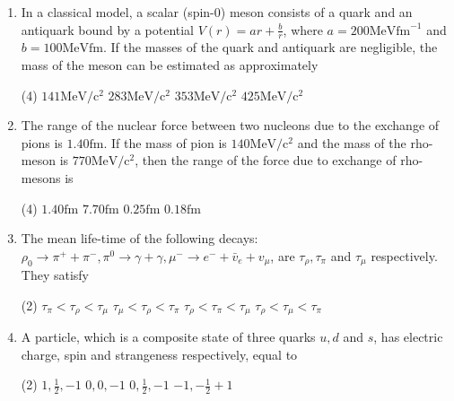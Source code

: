 \begin{enumerate}
	\item  In a classical model, a scalar (spin-0) meson consists of a quark and an antiquark bound by a potential $V(r)=a r+\frac{b}{r}$, where $a=200 \mathrm{MeV} \mathrm{fm}^{-1}$ and $b=100 \mathrm{MeV} \mathrm{fm}$. If the masses of the quark and antiquark are negligible, the mass of the meson can be estimated as approximately
	{}
	 \begin{tasks}(4)
		\task[\textbf{a.}]$141 \mathrm{MeV} / \mathrm{c}^2$
		\task[\textbf{b.}] $283 \mathrm{MeV} / \mathrm{c}^2$
		\task[\textbf{c.}]$353 \mathrm{MeV} / \mathrm{c}^2$
		\task[\textbf{d.}] $425 \mathrm{MeV} / \mathrm{c}^2$
	\end{tasks}

	\item  The range of the nuclear force between two nucleons due to the exchange of pions is $1.40 \mathrm{fm}$. If the mass of pion is $140 \mathrm{MeV} / \mathrm{c}^2$ and the mass of the rho-meson is $770 \mathrm{MeV} / \mathrm{c}^2$, then the range of the force due to exchange of rho-mesons is
	{}
	 \begin{tasks}(4)
		\task[\textbf{a.}]$1.40 \mathrm{fm}$
		\task[\textbf{b.}]$7.70 \mathrm{fm}$
		\task[\textbf{c.}]$0.25 \mathrm{fm}$
		\task[\textbf{d.}]$0.18 \mathrm{fm}$ 
	\end{tasks}

	\item  The mean life-time of the following decays: $\rho_0 \rightarrow \pi^{+}+\pi^{-}, \pi^0 \rightarrow \gamma+\gamma, \mu^{-} \rightarrow e^{-}+\bar{v}_e+v_\mu$, are $\tau_\rho, \tau_\pi$ and $\tau_\mu$ respectively.
	They satisfy
	{}
	 \begin{tasks}(2)
		\task[\textbf{a.}]$\tau_\pi<\tau_\rho<\tau_\mu$
		\task[\textbf{b.}]$\tau_\mu<\tau_\rho<\tau_\pi$
		\task[\textbf{c.}]$\tau_\rho<\tau_\pi<\tau_\mu$
		\task[\textbf{d.}] $\tau_\rho<\tau_\mu<\tau_\pi$
	\end{tasks}

	\item  A particle, which is a composite state of three quarks $u, d$ and $s$, has electric charge, spin and strangeness respectively, equal to
	{}
	 \begin{tasks}(2)
		\task[\textbf{a.}]$1, \frac{1}{2},-1$
		\task[\textbf{b.}]$0,0,-1$
		\task[\textbf{c.}]$0, \frac{1}{2},-1$
		\task[\textbf{d.}] $-1,-\frac{1}{2}+1$
	\end{tasks}


\end{enumerate}
